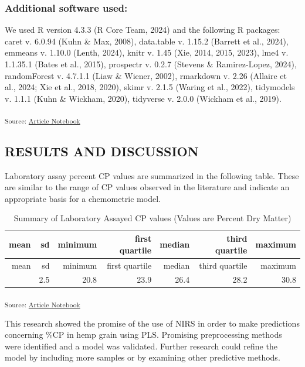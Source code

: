 \documentclass[
]{agujournal2019}
\begin{document}
\subsubsection{Additional software
used:}\label{additional-software-used}

We used R version 4.3.3 (R Core Team, 2024) and the following R
packages: caret v. 6.0.94 (Kuhn \& Max, 2008), data.table v. 1.15.2
(Barrett et al., 2024), emmeans v. 1.10.0 (Lenth, 2024), knitr v. 1.45
(Xie, 2014, 2015, 2023), lme4 v. 1.1.35.1 (Bates et al., 2015),
prospectr v. 0.2.7 (Stevens \& Ramirez-Lopez, 2024), randomForest v.
4.7.1.1 (Liaw \& Wiener, 2002), rmarkdown v. 2.26 (Allaire et al., 2024;
Xie et al., 2018, 2020), skimr v. 2.1.5 (Waring et al., 2022),
tidymodels v. 1.1.1 (Kuhn \& Wickham, 2020), tidyverse v. 2.0.0 (Wickham
et al., 2019).

\textsubscript{Source:
\href{https://rvcrawford.github.io/glowing-system/index.qmd.html}{Article
Notebook}}

\subsection{RESULTS AND DISCUSSION}\label{results-and-discussion}

Laboratory assay percent CP values are summarized in the following
table. These are similar to the range of CP values observed in the
literature and indicate an appropriate basis for a chemometric model.

\begin{longtable}[]{@{}rrrrrrr@{}}
\caption{Summary of Laboratory Assayed CP values (Values are Percent Dry
Matter)}\tabularnewline
\toprule\noalign{}
mean & sd & minimum & first quartile & median & third quartile &
maximum \\
\midrule\noalign{}
\endfirsthead
\toprule\noalign{}
mean & sd & minimum & first quartile & median & third quartile &
maximum \\
\midrule\noalign{}
\endhead
\bottomrule\noalign{}
\endlastfoot
26.1 & 2.5 & 20.8 & 23.9 & 26.4 & 28.2 & 30.8 \\
\end{longtable}

\textsubscript{Source:
\href{https://rvcrawford.github.io/glowing-system/index.qmd.html}{Article
Notebook}}

This research showed the promise of the use of NIRS in order to make
predictions concerning \%CP in hemp grain using PLS. Promising
preprocessing methods were identified and a model was validated. Further
research could refine the model by including more samples or by
examining other predictive methods.
\end{document}

